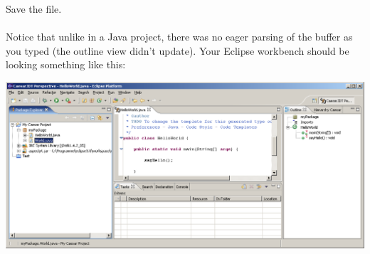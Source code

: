 Save the file.\\\\

Notice that unlike in a Java project, there was no eager parsing of the buffer as you typed (the outline view didn't update). Your Eclipse workbench should be looking something like this:\\
\begin{center}
	\includegraphics[width=1.0\textwidth]{images/workspace_newclass.png}
\end{center}